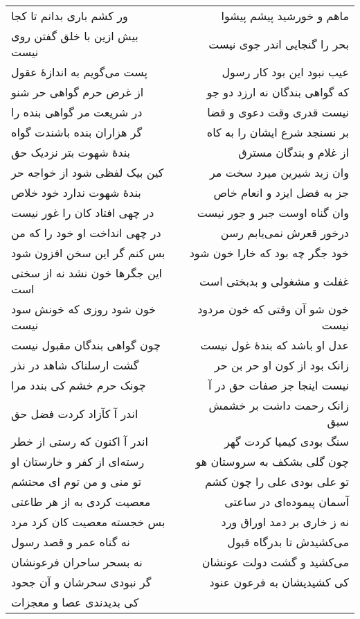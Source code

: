 \begin{center}
\begin{longtable}{l p{0.5cm} r}
ور کشم باری بدانم تا کجا
&&
ماهم و خورشید پیشم پیشوا
\\
بیش ازین با خلق گفتن روی نیست
&&
بحر را گنجایی اندر جوی نیست
\\
پست می‌گویم به اندازهٔ عقول
&&
عیب نبود این بود کار رسول
\\
از غرض حرم گواهی حر شنو
&&
که گواهی بندگان نه ارزد دو جو
\\
در شریعت مر گواهی بنده را
&&
نیست قدری وقت دعوی و قضا
\\
گر هزاران بنده باشندت گواه
&&
بر نسنجد شرع ایشان را به کاه
\\
بندهٔ شهوت بتر نزدیک حق
&&
از غلام و بندگان مسترق
\\
کین بیک لفظی شود از خواجه حر
&&
وان زید شیرین میرد سخت مر
\\
بندهٔ شهوت ندارد خود خلاص
&&
جز به فضل ایزد و انعام خاص
\\
در چهی افتاد کان را غور نیست
&&
وان گناه اوست جبر و جور نیست
\\
در چهی انداخت او خود را که من
&&
درخور قعرش نمی‌یابم رسن
\\
بس کنم گر این سخن افزون شود
&&
خود جگر چه بود که خارا خون شود
\\
این جگرها خون نشد نه از سختی است
&&
غفلت و مشغولی و بدبختی است
\\
خون شود روزی که خونش سود نیست
&&
خون شو آن وقتی که خون مردود نیست
\\
چون گواهی بندگان مقبول نیست
&&
عدل او باشد که بندهٔ غول نیست
\\
گشت ارسلناک شاهد در نذر
&&
زانک بود از کون او حر بن حر
\\
چونک حرم خشم کی بندد مرا
&&
نیست اینجا جز صفات حق در آ
\\
اندر آ کآزاد کردت فضل حق
&&
زانک رحمت داشت بر خشمش سبق
\\
اندر آ اکنون که رستی از خطر
&&
سنگ بودی کیمیا کردت گهر
\\
رسته‌ای از کفر و خارستان او
&&
چون گلی بشکف به سروستان هو
\\
تو منی و من توم ای محتشم
&&
تو علی بودی علی را چون کشم
\\
معصیت کردی به از هر طاعتی
&&
آسمان پیموده‌ای در ساعتی
\\
بس خجسته معصیت کان کرد مرد
&&
نه ز خاری بر دمد اوراق ورد
\\
نه گناه عمر و قصد رسول
&&
می‌کشیدش تا بدرگاه قبول
\\
نه بسحر ساحران فرعونشان
&&
می‌کشید و گشت دولت عونشان
\\
گر نبودی سحرشان و آن جحود
&&
کی کشیدیشان به فرعون عنود
\\
کی بدیدندی عصا و معجزات

\end{longtable}
\end{center}
